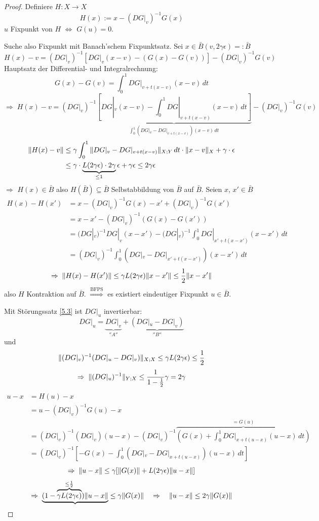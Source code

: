 \begin{proof}
	Definiere $H : X \to X$
	\[
		H(x) := x - (DG|_v)^{-1} G(x)
	\]
	$u$ Fixpunkt von $H$ $\Leftrightarrow$ $G(u) = 0$.

	Suche also Fixpunkt mit Banach'schem Fixpunktsatz. Sei $x \in \bar B(v,2\gamma\epsilon) =: \bar B$
	\[
		H(x) - v = (DG|_v)^{-1} \left[ DG|_v(x-v)-(G(x)-G(v)) \right] - (DG|_v)^{-1}G(v)
	\]
	Hauptsatz der Differential- und Integralrechnung:
	\[
		G(x)-G(v) = \int_0^1 DG|_{v+t(x-v)}(x-v) \, dt
	\]
	\[
		\Rightarrow \; H(x)-v=(DG|_v)^{-1} \underbrace{\left[ DG|_v(x-v)-\int_0^1 DG|_{v+t(x-v)}(x-v) \, dt \right]}_{\int_0^1 (DG|_v-DG|_{v+t(x-v)})(x-v) \, dt} - (DG|_v)^{-1}G(v)
	\]
	\begin{align} \label{eq:5.2}
		\|H(x)-v\| &\leq \gamma \int_0^1 \|DG|_v - DG|_{v+t(x-v)}\|_{X;Y} \, dt \cdot \|x-v\|_X + \gamma \cdot \epsilon\\
		&\leq \gamma \cdot \underbrace{L(2\gamma \epsilon) \cdot 2 \gamma}_{\leq 1} \epsilon + \gamma \epsilon \leq 2\gamma \epsilon \notag
	\end{align}
	$\Rightarrow$ $H(x) \in \bar B$ also $H(\bar B) \subseteq \bar B$ Selbstabbildung von $\bar B$ auf $\bar B$.
	Seien $x$, $x' \in \bar B$
	\begin{align*}
		H(x)-H(x') &= x-(DG|_v)^{-1}G(x)-x'+(DG|_v)^{-1}G(x')\\
		&= x-x'-(DG|_v)^{-1}(G(x)-G(x'))\\
		&= (DG|_v)^{-1} DG|_v(x-x')-(DG|_v)^{-1} \int_0^1 DG|_{x'+t(x-x')}(x-x') \, dt\\
		&= (DG|_v)^{-1} \int_0^1 (DG|_v-DG|_{x'+t(x-x')})(x-x') \, dt \tag{5.2'} \label{eq:5.2'}
	\end{align*}
	\[
		\Rightarrow \; \|H(x)-H(x')\| \leq \gamma L(2\gamma\epsilon) \|x-x'\| \leq \frac{1}{2} \|x-x'\|
	\]
	also $H$ Kontraktion auf $\bar B$.
	$\stackrel{\text{BFPS}}{\Rightarrow}$ es existiert eindeutiger Fixpunkt $u \in \bar B$.

	Mit Störungssatz \ref{5.3} ist $DG|_u$ invertierbar:
	\[
		DG|_u = \underbrace{DG|_v}_{''A''} + \underbrace{(DG|_u-DG|_v)}_{''B''}
	\]
	und
	\[
		\|(DG|_v)^{-1}(DG|_u-DG|_v)\|_{X;X} \leq \gamma L(2\gamma\epsilon) \leq \frac{1}{2}
	\]
	\[
		\Rightarrow \; \|(DG|_u)^{-1}\|_{Y;X} \leq \frac{1}{1-\frac{1}{2}}\gamma = 2\gamma
	\]
	\begin{align*}
		u-x &= H(u)-x \\
		&= u-(DG|_v)^{-1}G(u)-x\\
		&=(DG|_v)^{-1}(DG|_v)(u-x)-(DG|_v)^{-1}\overbrace{\left( G(x)+\int_0^1 DG|_{x+t(u-x)}(u-x) \, dt \right)}^{= G(u)}\\
		&=(DG|_v)^{-1} \left[-G(x)-\int_0^1 (DG|_v-DG|_{x+t(u-x)})(u-x) \, dt \right]
	\end{align*}
	\[
		\Rightarrow \; \|u-x\| \leq \gamma [\|G(x)\|+L(2\gamma\epsilon)\|u-x\|]
	\]
	\[
		\Rightarrow \; \underbrace{(1-\overbrace{\gamma L(2\gamma\epsilon)}^{\leq \frac{1}{2}}) \|u-x\|} \leq \gamma \|G(x)\| \quad \Rightarrow \quad \|u-x\| \leq 2 \gamma \|G(x)\|
	\]
\end{proof}

